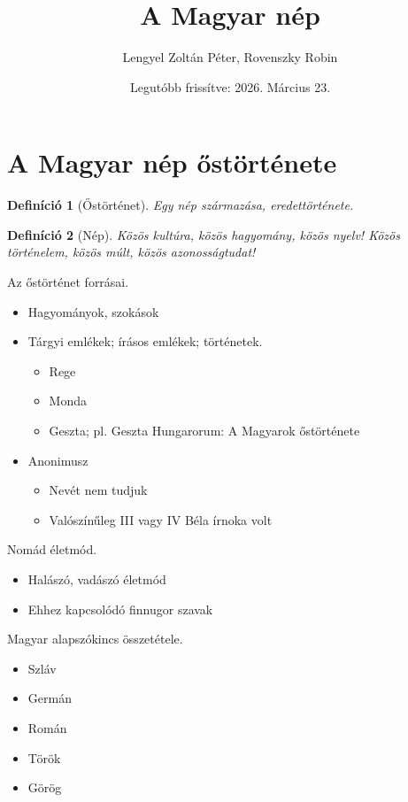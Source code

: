 \documentclass{article}
\title{A Magyar nép}
\author{Lengyel Zoltán Péter, Rovenszky Robin}
\date{Legutóbb frissítve: 2026. Március 23.}
\newtheorem{definition}{Definíció}
\begin{document}
\maketitle
\tableofcontents
\newpage

\section{A Magyar nép őstörténete}
\begin{definition}[Őstörténet]
    Egy nép származása, eredettörténete.
\end{definition}

\begin{definition}[Nép]
    Közös kultúra, közös hagyomány, közös nyelv! Közös történelem, közös múlt, közös azonosságtudat!
\end{definition}
Az őstörténet forrásai.
\begin{itemize}
    \item Hagyományok, szokások
    \item Tárgyi emlékek; írásos emlékek; történetek.
    
    \begin{itemize}
        \item Rege
        \item Monda
        \item Geszta; pl. Geszta Hungarorum: A Magyarok őstörténete
    \end{itemize}
    \item Anonimusz \begin{itemize}
    \item Nevét nem tudjuk
    \item Valószínűleg III vagy IV Béla írnoka volt 
\end{itemize}
\end{itemize}

Nomád életmód.
\begin{itemize}
    \item Halászó, vadászó életmód
    \item Ehhez kapcsolódó finnugor szavak
\end{itemize}
Magyar alapszókincs összetétele.
\begin{itemize}
    \item Szláv
    \item Germán
    \item Román
    \item Török
    \item Görög
\end{itemize}
\end{document}
